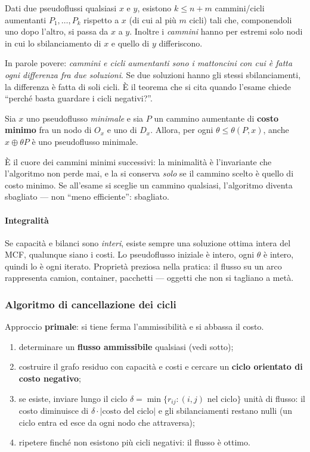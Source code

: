 \documentclass[12pt]{extarticle} %
\begin{document}
\begin{tcolorbox}[colback=gray!6, colframe=black!60, title=\textbf{Teorema di struttura degli pseudoflussi}]
Dati due pseudoflussi qualsiasi $x$ e $y$, esistono $k \le n+m$ cammini/cicli aumentanti $P_1,\dots,P_k$ rispetto a $x$ (di cui al più $m$ cicli) tali che, componendoli uno dopo l'altro, si passa da $x$ a $y$. Inoltre i \emph{cammini} hanno per estremi solo nodi in cui lo sbilanciamento di $x$ e quello di $y$ differiscono.
\end{tcolorbox}
\noindent In parole povere: \emph{cammini e cicli aumentanti sono i mattoncini con cui è fatta ogni differenza fra due soluzioni}. Se due soluzioni hanno gli stessi sbilanciamenti, la differenza è fatta di soli cicli. È il teorema che si cita quando l'esame chiede ``perché basta guardare i cicli negativi?''.

\begin{tcolorbox}[colback=gray!6, colframe=black!60, title=\textbf{Teorema (i cammini minimi conservano la minimalità)}]
Sia $x$ uno pseudoflusso \emph{minimale} e sia $P$ un cammino aumentante di \textbf{costo minimo} fra un nodo di $O_x$ e uno di $D_x$. Allora, per ogni $\theta \le \theta(P,x)$, anche $x \oplus \theta P$ è uno pseudoflusso minimale.
\end{tcolorbox}
\noindent È il cuore dei cammini minimi successivi: la minimalità è l'invariante che l'algoritmo non perde mai, e la si conserva \emph{solo} se il cammino scelto è quello di costo minimo. Se all'esame si sceglie un cammino qualsiasi, l'algoritmo diventa sbagliato --- non ``meno efficiente'': sbagliato.

\paragraph{Integralità}
Se capacità e bilanci sono \emph{interi}, esiste sempre una soluzione ottima intera del MCF, qualunque siano i costi. Lo pseudoflusso iniziale è intero, ogni $\theta$ è intero, quindi lo è ogni iterato. Proprietà preziosa nella pratica: il flusso su un arco rappresenta camion, container, pacchetti --- oggetti che non si tagliano a metà.

\subsubsection{Algoritmo di cancellazione dei cicli}
Approccio \textbf{primale}: si tiene ferma l'ammissibilità e si abbassa il costo.
\begin{enumerate}
    \item determinare un \textbf{flusso ammissibile} qualsiasi (vedi sotto);
    \item costruire il grafo residuo con capacità e costi e cercare un \textbf{ciclo orientato di costo negativo};
    \item se esiste, inviare lungo il ciclo $\delta = \min\{r_{ij} : (i,j) \text{ nel ciclo}\}$ unità di flusso: il costo diminuisce di $\delta \cdot |\text{costo del ciclo}|$ e gli sbilanciamenti restano nulli (un ciclo entra ed esce da ogni nodo che attraversa);
    \item ripetere finché non esistono più cicli negativi: il flusso è ottimo.
\end{enumerate}
\end{document}
